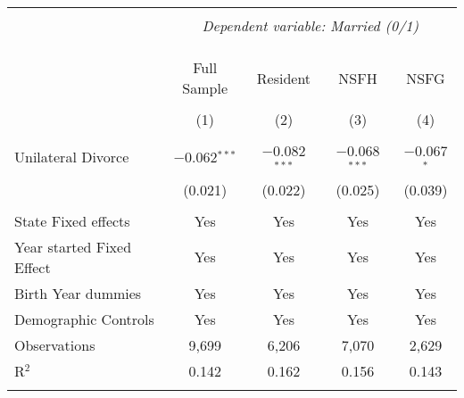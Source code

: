 
\begingroup 
\footnotesize 
\begin{tabular}{@{\extracolsep{5pt}}lcccc} 
\\[-1.8ex]\hline 
\hline \\[-1.8ex] 
 & \multicolumn{4}{c}{\textit{Dependent variable: Married (0/1)}} \\ 
\cline{2-5} 
\\[-1.8ex] &  &  &  & \\[-4.8ex] \\ 
 & Full Sample & Resident & NSFH & NSFG \\ 
\\[-1.8ex] & (1) & (2) & (3) & (4)\\ 
\hline \\[-1.8ex] 
 Unilateral Divorce & $-$0.062$^{***}$ & $-$0.082$^{***}$ & $-$0.068$^{***}$ & $-$0.067$^{*}$ \\ 
  & (0.021) & (0.022) & (0.025) & (0.039) \\ 
 \hline \\[-1.8ex] 
State Fixed effects & Yes & Yes & Yes & Yes \\ 
Year started Fixed Effect & Yes & Yes & Yes & Yes \\ 
Birth Year dummies & Yes & Yes & Yes & Yes \\ 
Demographic Controls & Yes & Yes & Yes & Yes \\ 
Observations & 9,699 & 6,206 & 7,070 & 2,629 \\ 
R$^{2}$ & 0.142 & 0.162 & 0.156 & 0.143 \\ 
\hline 
\hline \\[-1.8ex] 
\end{tabular} 
\endgroup 
